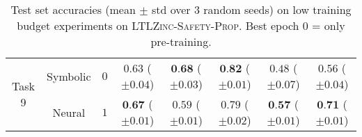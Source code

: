 \begin{table*}[!t]
{\begin{tabular}{cccccccc}
			\multirow{2}{*}{Task 9} & Symbolic & $0$ & $0.63 $ {\tiny ($\pm 0.04$)} & $\textbf{0.68} $ {\tiny ($\pm 0.03$)} & $\textbf{0.82} $ {\tiny ($\pm 0.01$)} & $0.48 $ {\tiny ($\pm 0.07$)} & $0.56 $ {\tiny ($\pm 0.04$)}\\
			& Neural & $1$ & $\textbf{0.67} $ {\tiny ($\pm 0.01$)} & $0.59 $ {\tiny ($\pm 0.01$)} & $0.79 $ {\tiny ($\pm 0.02$)} & $\textbf{0.57} $ {\tiny ($\pm 0.01$)} & $\textbf{0.71} $ {\tiny ($\pm 0.01$)}\\
			\bottomrule
		\end{tabular}
	}
	\caption[Low training budget experiments on \textsc{LTLZinc-Safety-Prop}]{Test set accuracies (mean $\pm$ std over 3 random seeds) on low training budget experiments on \textsc{LTLZinc-Safety-Prop}. Best epoch 0 = only pre-training.}\label{ansya:tab:1epochprop}
\end{table*}

